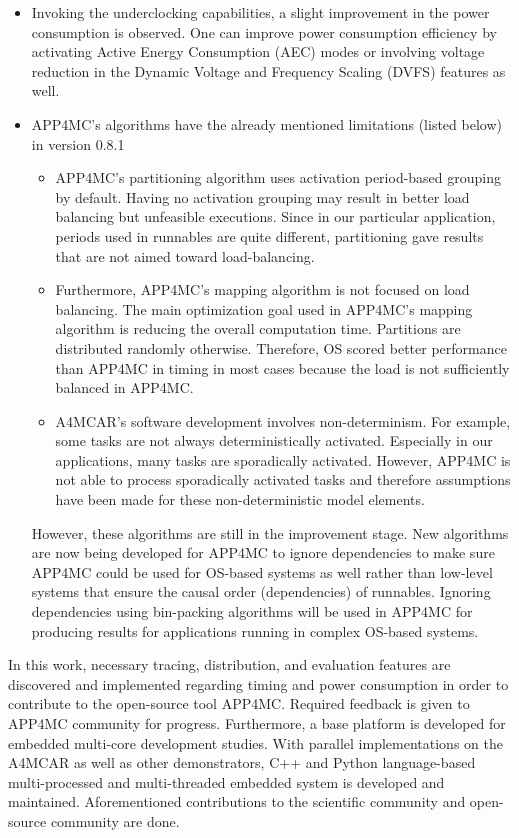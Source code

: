 \begin{itemize}
	\item Invoking the underclocking capabilities, a slight improvement in the power consumption is observed. One can improve power consumption efficiency by activating Active Energy Consumption (AEC) modes or involving voltage reduction in the Dynamic Voltage and Frequency Scaling (DVFS) features as well.
	\item APP4MC's algorithms have the already mentioned limitations (listed below) in version 0.8.1
	\begin{itemize}
		\item APP4MC's partitioning algorithm uses activation period-based grouping by default. Having no activation grouping may result in better load balancing but unfeasible executions. Since in our particular application, periods used in runnables are quite different, partitioning gave results that are not aimed toward load-balancing.
		\item Furthermore, APP4MC's mapping algorithm is not focused on load balancing. The main optimization goal used in APP4MC's mapping algorithm is reducing the overall computation time. Partitions are distributed randomly otherwise. Therefore, OS scored better performance than APP4MC in timing in most cases because the load is not sufficiently balanced in APP4MC.
		\item A4MCAR's software development involves non-determinism. For example, some tasks are not always deterministically activated. Especially in our applications, many tasks are sporadically activated. However, APP4MC is not able to process sporadically activated tasks and therefore assumptions have been made for these non-deterministic model elements.
	\end{itemize}
	 However, these algorithms are still in the improvement stage. New algorithms are now being developed for APP4MC to ignore dependencies to make sure APP4MC could be used for OS-based systems as well rather than low-level systems that ensure the causal order (dependencies) of runnables. Ignoring dependencies using bin-packing algorithms will be used in APP4MC for producing results for applications running in complex OS-based systems.
\end{itemize}

In this work, necessary tracing, distribution, and evaluation features are discovered and implemented regarding timing and power consumption in order to contribute to the open-source tool APP4MC. Required feedback is given to APP4MC community for progress. Furthermore, a base platform is developed for embedded multi-core development studies. With parallel implementations on the A4MCAR as well as other demonstrators, C++ and Python language-based multi-processed and multi-threaded embedded system is developed and maintained. Aforementioned contributions to the scientific community and open-source community are done. 

